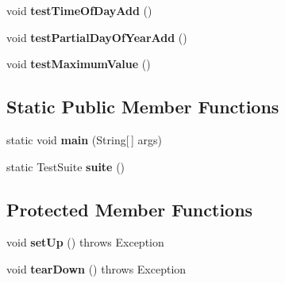 \begin{DoxyCompactItemize}
\item 
\hypertarget{classorg_1_1joda_1_1time_1_1chrono_1_1_test_i_s_o_chronology_aa3343f3da8bcef9f19c7a1bbe9ba22b3}{void {\bfseries test\-Time\-Of\-Day\-Add} ()}\label{classorg_1_1joda_1_1time_1_1chrono_1_1_test_i_s_o_chronology_aa3343f3da8bcef9f19c7a1bbe9ba22b3}

\item 
\hypertarget{classorg_1_1joda_1_1time_1_1chrono_1_1_test_i_s_o_chronology_aa9e1c7f134609ba465e9c2c1c3ce356b}{void {\bfseries test\-Partial\-Day\-Of\-Year\-Add} ()}\label{classorg_1_1joda_1_1time_1_1chrono_1_1_test_i_s_o_chronology_aa9e1c7f134609ba465e9c2c1c3ce356b}

\item 
\hypertarget{classorg_1_1joda_1_1time_1_1chrono_1_1_test_i_s_o_chronology_af1b7742acb6915e802ab4d2d3fb6b120}{void {\bfseries test\-Maximum\-Value} ()}\label{classorg_1_1joda_1_1time_1_1chrono_1_1_test_i_s_o_chronology_af1b7742acb6915e802ab4d2d3fb6b120}

\end{DoxyCompactItemize}
\subsection*{Static Public Member Functions}
\begin{DoxyCompactItemize}
\item 
\hypertarget{classorg_1_1joda_1_1time_1_1chrono_1_1_test_i_s_o_chronology_a7297c1daae1e566e85faf9f34392981a}{static void {\bfseries main} (String\mbox{[}$\,$\mbox{]} args)}\label{classorg_1_1joda_1_1time_1_1chrono_1_1_test_i_s_o_chronology_a7297c1daae1e566e85faf9f34392981a}

\item 
\hypertarget{classorg_1_1joda_1_1time_1_1chrono_1_1_test_i_s_o_chronology_a20c0ffa347cdba40fb97f034ac8d0484}{static Test\-Suite {\bfseries suite} ()}\label{classorg_1_1joda_1_1time_1_1chrono_1_1_test_i_s_o_chronology_a20c0ffa347cdba40fb97f034ac8d0484}

\end{DoxyCompactItemize}
\subsection*{Protected Member Functions}
\begin{DoxyCompactItemize}
\item 
\hypertarget{classorg_1_1joda_1_1time_1_1chrono_1_1_test_i_s_o_chronology_a360999534897c0d509310b3cef2cbac2}{void {\bfseries set\-Up} ()  throws Exception }\label{classorg_1_1joda_1_1time_1_1chrono_1_1_test_i_s_o_chronology_a360999534897c0d509310b3cef2cbac2}

\item 
\hypertarget{classorg_1_1joda_1_1time_1_1chrono_1_1_test_i_s_o_chronology_a18ca28f633dabd0ac81b3b3ab88a8381}{void {\bfseries tear\-Down} ()  throws Exception }\label{classorg_1_1joda_1_1time_1_1chrono_1_1_test_i_s_o_chronology_a18ca28f633dabd0ac81b3b3ab88a8381}

\end{DoxyCompactItemize}


